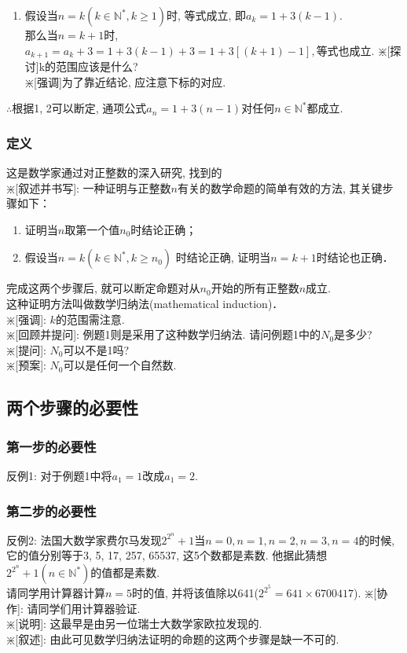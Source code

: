 \documentclass{article}
\begin{document}
\begin{CJK}{UTF8}{gkai}
\begin{enumerate}[i]
\item 假设当$n = k (k \in \mathbb{N}^*, k \ge 1)$时, 等式成立, 即$a_k = 1 + 3(k-1).$\\那么当$n = k + 1$时, $a_{k+1} = a_k + 3 = 1 + 3(k-1) + 3 = 1 +3[(k + 1) - 1], $等式也成立.
$\divideontimes$[探讨]k的范围应该是什么?\\
$\divideontimes$[强调]为了靠近结论, 应注意下标的对应.
\end{enumerate}
$\therefore$根据1, 2可以断定, 通项公式$a_n = 1 + 3(n-1)$对任何$n \in \mathbb{N}^*$都成立.

\subsubsection{定义}
这是数学家通过对正整数的深入研究, 找到的\\
$\divideontimes$[叙述并书写]: 一种证明与正整数$n$有关的数学命题的简单有效的方法, 其关键步骤如下：
\begin{enumerate}[i]
\item 证明当$n$取第一个值$n_0$时结论正确；
\item 假设当$n = k (k \in \mathbb{N}^*, k \geq n_0)$ 时结论正确, 证明当$n = k + 1$时结论也正确．
\end{enumerate}
完成这两个步骤后, 就可以断定命题对从$n_0$开始的所有正整数$n$成立.\\这种证明方法叫做数学归纳法(mathematical induction)．\\
$\divideontimes$[强调]: $k$的范围需注意.\\
$\divideontimes$[回顾并提问]: 例题1则是采用了这种数学归纳法. 请问例题1中的$N_0$是多少?\\
$\divideontimes$[提问]: $N_0$可以不是1吗?\\
$\divideontimes$[预案]: $N_0$可以是任何一个自然数.

\subsection{两个步骤的必要性}
\subsubsection{第一步的必要性}
反例1: 对于例题1中将$a_1 = 1$改成$a_1 = 2.$

\subsubsection{第二步的必要性}
反例2: 法国大数学家费尔马发现$2^{2^n} + 1$当$n=0, n=1, n=2, n=3, n=4$的时候, 它的值分别等于3, 5, 17, 257, 65537, 这5个数都是素数. 他据此猜想$2^{2^n} + 1(n \in \mathbb{N}^*)$的值都是素数.\\
请同学用计算器计算$n = 5$时的值, 并将该值除以641($2^{2^5} = 641 \times 6700417$).
$\divideontimes$[协作]: 请同学们用计算器验证.\\
$\divideontimes$[说明]: 这最早是由另一位瑞士大数学家欧拉发现的.  
\\[2ex]$\divideontimes$[叙述]: 由此可见数学归纳法证明的命题的这两个步骤是缺一不可的.


\end{CJK}
\end{document}
